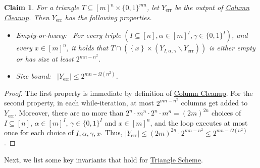 \documentclass[11pt]{article}
\numberwithin{equation}{section}
\newtheorem{claim}[theorem]{Claim}
\theoremstyle{definition}
\theoremstyle{plain}
\newcommand{\trischeme}{\hyperref[alg:tri-partition]{Triangle Scheme}\xspace}
\newcommand{\columnclean}{\hyperref[alg:column-cleanup]{Column Cleanup}\xspace}
\DeclareMathOperator{\err}{err}
\newcommand{\allX}{[m]^n}
\newcommand{\allY}{\{0,1\}^{mn}}
\newcommand{\set}[1]{\left \{ #1 \right \}}
\newcommand{\bit}{\{0,1\}}
\begin{document}
\begin{claim}\label{clm:col-clean}
For a triangle $T \subseteq \allX \times \allY$, let $Y_{\err}$ be the output of \columnclean. 
%
%
%
%
Then $Y_{\err}$ has the following properties. %
\begin{itemize}
	\item \emph{Empty-or-heavy:}~ For every triple $(I \subseteq [n], \alpha \in [m]^I, \gamma \in \bit^I)$, and every $x \in \allX$, it holds that $T \cap (\set{x} \times (Y_{I,\alpha,\gamma}\smallsetminus Y_{\err}))$ is either empty or has size at least $2^{mn-n^2}$.
	\item \emph{Size bound:}~ $|Y_{\err}| \le 2^{mn - \Omega(n^2)}$.
\end{itemize}
\end{claim}
\begin{proof}
The first property is immediate by definition of \columnclean. For the second property, in each while-iteration, at most $2^{mn-n^2}$ columns get added to $Y_{\err}$. Moreover, there are no more than $2^n \cdot m^n \cdot 2^n \cdot m^n = (2m)^{2n}$ choices of $I\subseteq [n]$, $\alpha \in [m]^I$, $\gamma \in \bit^I$ and $x \in [m]^n$, and the loop executes at most once for each choice of $I, \alpha, \gamma, x$. Thus, $|Y_{\err}| \le (2m)^{2n} \cdot 2^{mn - n^2} \le 2^{mn - \Omega(n^2)}$.
\end{proof}

Next, we list some key invariants that hold for \trischeme. 
\end{document}
